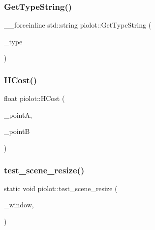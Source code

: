 \mbox{\label{namespacepiolot_a488b12f83c55ec14c4a0b967d089b0f2}} 
\subsubsection{\texorpdfstring{Get\+Type\+String()}{GetTypeString()}}
{\footnotesize\ttfamily \+\_\+\+\_\+forceinline std\+::string piolot\+::\+Get\+Type\+String (\begin{DoxyParamCaption}\item[{\mbox{\hyperlink{namespacepiolot_a23b501c43e72ecf3dbf1146b2919c3a3}{Log\+Type}}}]{\+\_\+type }\end{DoxyParamCaption})}

\mbox{\label{namespacepiolot_adf45d5b01aecdade8cbb9ba156173a78}} 
\subsubsection{\texorpdfstring{H\+Cost()}{HCost()}}
{\footnotesize\ttfamily float piolot\+::\+H\+Cost (\begin{DoxyParamCaption}\item[{\mbox{\hyperlink{classpiolot_1_1_map_tile}{Map\+Tile}} $\ast$}]{\+\_\+pointA,  }\item[{\mbox{\hyperlink{classpiolot_1_1_map_tile}{Map\+Tile}} $\ast$}]{\+\_\+pointB }\end{DoxyParamCaption})}

\mbox{\label{namespacepiolot_aa0ef29ea15ee9e00027a276fa8d430e6}} 
\subsubsection{\texorpdfstring{test\+\_\+scene\+\_\+resize()}{test\_scene\_resize()}}
{\footnotesize\ttfamily static void piolot\+::test\+\_\+scene\+\_\+resize (\begin{DoxyParamCaption}\item[{G\+L\+F\+Wwindow $\ast$}]{\+\_\+window,  }\item[{int}]{ }\end{DoxyParamCaption})\hspace{0.3cm}{\ttfamily [static]}}

